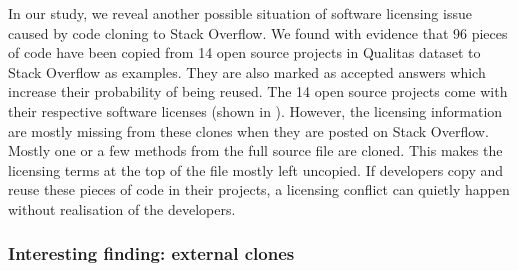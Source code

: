 \documentclass{sig-alternate-05-2015}
\begin{document}
In our study, we reveal another possible situation of software licensing issue caused by code cloning to Stack Overflow. We found with evidence that 96 pieces of code have been copied from 14 open source projects in Qualitas dataset to Stack Overflow as examples. They are also marked as accepted answers which increase their probability of being reused. The 14 open source projects come with their respective software licenses (shown in ). However, the licensing information are mostly missing from these clones when they are posted on Stack Overflow. Mostly one or a few methods from the full source file are cloned. This makes the licensing terms at the top of the file mostly left uncopied. If developers copy and reuse these pieces of code in their projects, a licensing conflict can quietly happen without realisation of the developers. 

\subsubsection{Interesting finding: external clones}
\end{document}
